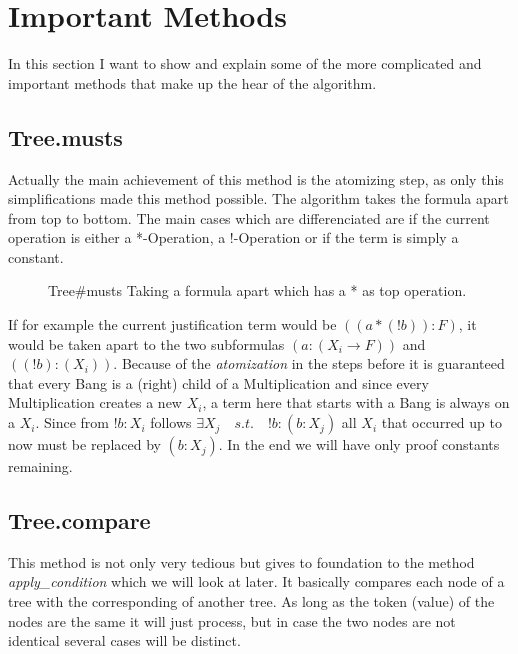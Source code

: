 \section{Important Methods}
In this section I want to show and explain some of the more complicated and important methods that make up the hear of the algorithm.

\subsection{Tree.musts}
Actually the main achievement of this method is the atomizing step, as only this simplifications made this method possible.
The algorithm takes the formula apart from top to bottom. The main cases which are differenciated are if the current operation is either a *-Operation, a !-Operation or if the term is simply a constant.

\begin{figure}[H]
    \vspace{-10pt}
	
	\vspace{-10pt}
	\caption{Tree\#musts Taking a formula apart which has a * as top operation. }
	\vspace{-10pt}
\end{figure}

If for example the current justification term would be $((a*(!b)):F)$, it would be taken apart to the two subformulas $(a:(X_i\rightarrow F))$ and $((!b):(X_i))$. Because of the \emph{atomization} in the steps before it is guaranteed that every Bang is a (right) child of a Multiplication and since every Multiplication creates a new $X_i$, a term here that starts with a Bang is always on a $X_i$. Since from $!b:X_i$ follows $\exists X_j \quad s.t. \quad !b:(b:X_j)$ all $X_i$ that occurred up to now must be replaced by $(b:X_j)$. In the end we will have only proof constants remaining.

\subsection{Tree.compare}
This method is not only very tedious but gives to foundation to the method \emph{apply\_condition} which we will look at later. It basically compares each node of a tree with the corresponding of another tree. As long as the token (value) of the nodes are the same it will just process, but in case the two nodes are not identical several cases will be distinct.


